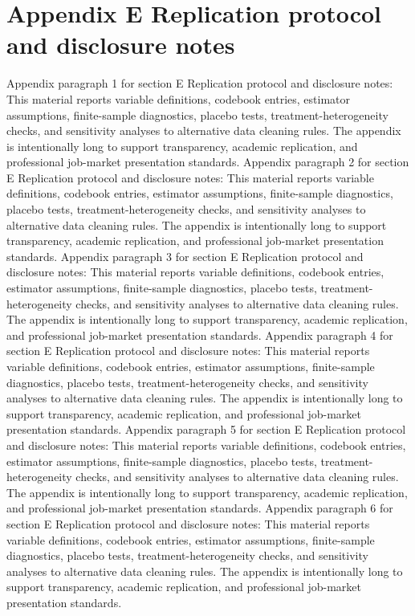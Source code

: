 \documentclass[preprint,12pt]{elsarticle}
\begin{document}
\section{Appendix E Replication protocol and disclosure notes}
Appendix paragraph 1 for section E Replication protocol and disclosure notes: This material reports variable definitions, codebook entries, estimator assumptions, finite-sample diagnostics, placebo tests, treatment-heterogeneity checks, and sensitivity analyses to alternative data cleaning rules. The appendix is intentionally long to support transparency, academic replication, and professional job-market presentation standards.
Appendix paragraph 2 for section E Replication protocol and disclosure notes: This material reports variable definitions, codebook entries, estimator assumptions, finite-sample diagnostics, placebo tests, treatment-heterogeneity checks, and sensitivity analyses to alternative data cleaning rules. The appendix is intentionally long to support transparency, academic replication, and professional job-market presentation standards.
Appendix paragraph 3 for section E Replication protocol and disclosure notes: This material reports variable definitions, codebook entries, estimator assumptions, finite-sample diagnostics, placebo tests, treatment-heterogeneity checks, and sensitivity analyses to alternative data cleaning rules. The appendix is intentionally long to support transparency, academic replication, and professional job-market presentation standards.
Appendix paragraph 4 for section E Replication protocol and disclosure notes: This material reports variable definitions, codebook entries, estimator assumptions, finite-sample diagnostics, placebo tests, treatment-heterogeneity checks, and sensitivity analyses to alternative data cleaning rules. The appendix is intentionally long to support transparency, academic replication, and professional job-market presentation standards.
Appendix paragraph 5 for section E Replication protocol and disclosure notes: This material reports variable definitions, codebook entries, estimator assumptions, finite-sample diagnostics, placebo tests, treatment-heterogeneity checks, and sensitivity analyses to alternative data cleaning rules. The appendix is intentionally long to support transparency, academic replication, and professional job-market presentation standards.
Appendix paragraph 6 for section E Replication protocol and disclosure notes: This material reports variable definitions, codebook entries, estimator assumptions, finite-sample diagnostics, placebo tests, treatment-heterogeneity checks, and sensitivity analyses to alternative data cleaning rules. The appendix is intentionally long to support transparency, academic replication, and professional job-market presentation standards.
\end{document}
